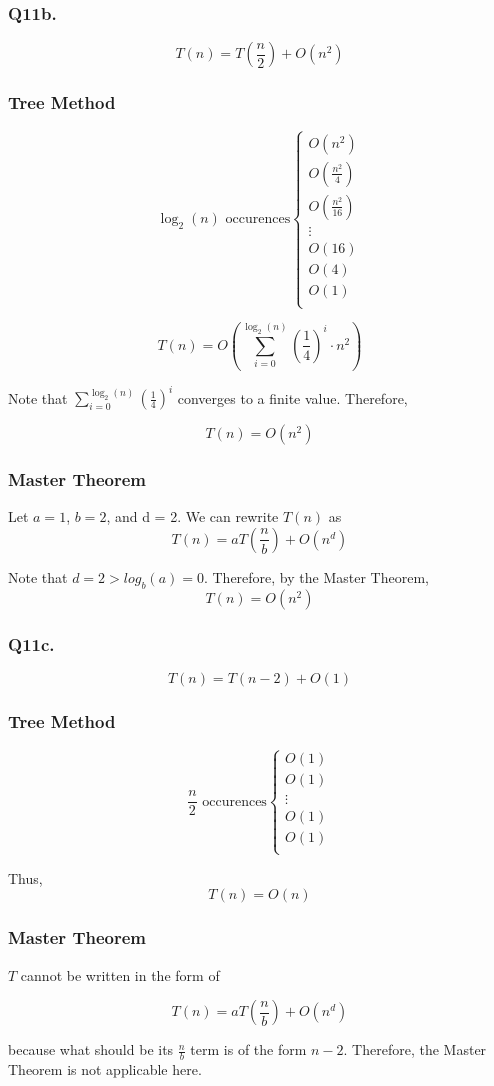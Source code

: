 \documentclass{article}
\theoremstyle{definition}
\begin{document}
\subsubsection{Q11b.}

$$T(n) = T\left(\frac{n}{2}\right) + O\left(n^2\right)$$

\subsubsection*{Tree Method}
$$\log_2(n)\text{ occurences} \begin{cases}
    O(n^2)  \\
    O(\frac{n^2}{4})  \\
    O(\frac{n^2}{16})  \\
    \vdots \\
    O(16)  \\
    O(4)  \\
    O(1)  \\
\end{cases}$$

$$T(n) = O\left( \sum^{\log_2(n)}_{i=0} \left( \frac{1}{4} \right)^i \cdot n^2 \right)$$

Note that $\displaystyle\sum^{\log_2(n)}_{i=0} \left( \frac{1}{4} \right)^i$ converges to a finite value. Therefore,

$$T(n) = O(n^2)$$

\subsubsection*{Master Theorem}

Let $a = 1$, $b = 2$, and d = 2. We can rewrite $T(n)$ as
$$T(n) = aT\left(\frac{n}{b}\right) + O(n^d)$$

Note that $d = 2 > log_b(a) = 0$. Therefore, by the Master Theorem,
$$T(n) = O(n^2)$$

\subsubsection{Q11c.}

$$T(n) = T(n - 2) + O(1)$$

\subsubsection*{Tree Method}

$$\frac{n}{2}\text{ occurences} \begin{cases}
    O(1)  \\
    O(1)  \\
    \vdots \\
    O(1)  \\
    O(1)  \\
\end{cases}$$

Thus,
$$T(n) = O(n)$$

\subsubsection*{Master Theorem}
$T$ cannot be written in the form of 

$$T(n) = aT\left(\frac{n}{b}\right) + O(n^d)$$

because what should be its $\frac{n}{b}$ term is of the form $n - 2$. Therefore, the Master Theorem is not applicable here.
\end{document}
